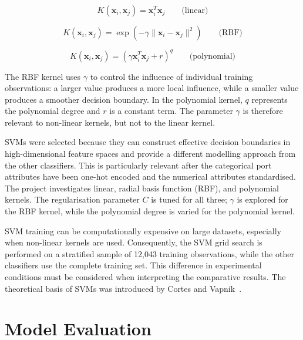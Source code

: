 \begin{equation}
K(\mathbf{x}_i,\mathbf{x}_j)
= \mathbf{x}_i^{T}\mathbf{x}_j
\qquad \text{(linear)}
\label{eq:linear_kernel}
\end{equation}

\begin{equation}
K(\mathbf{x}_i,\mathbf{x}_j)
= \exp\left(
-\gamma\|\mathbf{x}_i-\mathbf{x}_j\|^2
\right)
\qquad \text{(RBF)}
\label{eq:rbf_kernel}
\end{equation}

\begin{equation}
K(\mathbf{x}_i,\mathbf{x}_j)
= (\gamma\mathbf{x}_i^{T}\mathbf{x}_j+r)^q
\qquad \text{(polynomial)}
\label{eq:polynomial_kernel}
\end{equation}

The RBF kernel uses $\gamma$ to control the influence of individual training observations: a larger value produces a more local influence, while a smaller value produces a smoother decision boundary. In the polynomial kernel, $q$ represents the polynomial degree and $r$ is a constant term. The parameter $\gamma$ is therefore relevant to non-linear kernels, but not to the linear kernel.

SVMs were selected because they can construct effective decision boundaries in high-dimensional feature spaces and provide a different modelling approach from the other classifiers. This is particularly relevant after the categorical port attributes have been one-hot encoded and the numerical attributes standardised. The project investigates linear, radial basis function (RBF), and polynomial kernels. The regularisation parameter $C$ is tuned for all three; $\gamma$ is explored for the RBF kernel, while the polynomial degree is varied for the polynomial kernel.

SVM training can be computationally expensive on large datasets, especially when non-linear kernels are used. Consequently, the SVM grid search is performed on a stratified sample of 12,043 training observations, while the other classifiers use the complete training set. This difference in experimental conditions must be considered when interpreting the comparative results. The theoretical basis of SVMs was introduced by Cortes and Vapnik~\cite{cortes1995support}.

\section{Model Evaluation}

